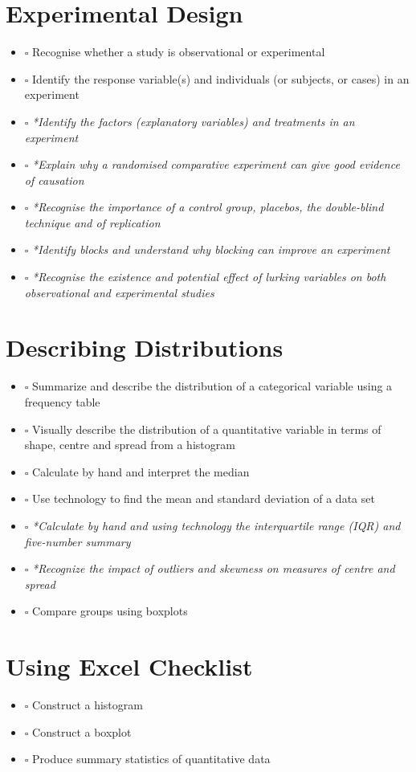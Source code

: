 \documentclass[
  11pt,
  oneside]{scrbook}
\providecommand{\tightlist}{%
  \setlength{\itemsep}{0pt}\setlength{\parskip}{0pt}}
\begin{document}
\section*{Experimental Design}

\begin{itemize}
\tightlist
\item
  \(\square\) Recognise whether a study is observational or experimental
\item
  \(\square\) Identify the response variable(s) and individuals (or subjects, or cases) in an experiment
\item
  \(\square\) \emph{*Identify the factors (explanatory variables) and treatments in an experiment}
\item
  \(\square\) \emph{*Explain why a randomised comparative experiment can give good evidence of causation}
\item
  \(\square\) \emph{*Recognise the importance of a control group, placebos, the double-blind technique and of replication}
\item
  \(\square\) \emph{*Identify blocks and understand why blocking can improve an experiment}
\item
  \(\square\) \emph{*Recognise the existence and potential effect of lurking variables on both observational and experimental studies}
\end{itemize}

\section*{Describing Distributions}

\begin{itemize}
\tightlist
\item
  \(\square\) Summarize and describe the distribution of a categorical variable using a frequency table
\item
  \(\square\) Visually describe the distribution of a quantitative variable in terms of shape, centre and spread from a histogram
\item
  \(\square\) Calculate by hand and interpret the median
\item
  \(\square\) Use technology to find the mean and standard deviation of a data set
\item
  \(\square\) \emph{*Calculate by hand and using technology the interquartile range (IQR) and five-number summary}
\item
  \(\square\) \emph{*Recognize the impact of outliers and skewness on measures of centre and spread}
\item
  \(\square\) Compare groups using boxplots
\end{itemize}

\section*{Using Excel Checklist}

\begin{itemize}
\tightlist
\item
  \(\square\) Construct a histogram
\item
  \(\square\) Construct a boxplot
\item
  \(\square\) Produce summary statistics of quantitative data
\end{itemize}


\end{document}
